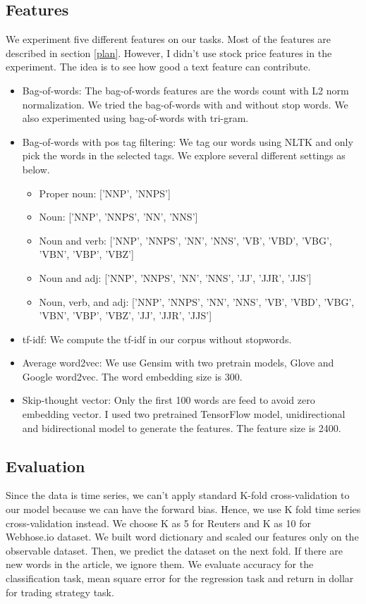 \documentclass[sigconf]{acmart}
\begin{document}
\subsection{Features}
We experiment five different features on our tasks. Most of the features are described in section \ref{plan}. However, I didn't use stock price features in the experiment.
The idea is to see how good a text feature can contribute.
\begin{itemize}
	\item Bag-of-words: The bag-of-words features are the words count with L2 norm normalization. We tried the bag-of-words with and without stop words. We also experimented using bag-of-words with tri-gram.
	\item Bag-of-words with pos tag filtering: We tag our words using NLTK \cite{nltk} and only pick the words in the selected tags. We explore several different settings as below.
		\begin{itemize}
			\item Proper noun: ['NNP', 'NNPS']
			\item Noun: ['NNP', 'NNPS', 'NN', 'NNS']
			\item Noun and verb: ['NNP', 'NNPS', 'NN', 'NNS', 'VB', 'VBD', 'VBG', 'VBN', 'VBP', 'VBZ']
			\item Noun and adj: ['NNP', 'NNPS', 'NN', 'NNS', 'JJ', 'JJR', 'JJS']
			\item Noun, verb, and adj: ['NNP', 'NNPS', 'NN', 'NNS', 'VB', 'VBD', 'VBG', 'VBN', 'VBP', 'VBZ', 'JJ', 'JJR', 'JJS']
		\end{itemize}
	\item tf-idf: We compute the tf-idf in our corpus without stopwords.
	\item Average word2vec: We use Gensim \cite{gensim} with two pretrain models, Glove\cite{glove} and Google word2vec\cite{word2vec1, word2vec2}. The word embedding size is 300.
	\item Skip-thought vector\cite{skip}: Only the first 100 words are feed to avoid zero embedding vector. I used two pretrained TensorFlow\cite{tf} model, unidirectional and bidirectional model\cite{skip} to generate the features.
	The feature size is 2400.
\end{itemize} 

\subsection{Evaluation}
Since the data is time series, we can't apply standard K-fold cross-validation to our model because we can have the forward bias. Hence, we use K fold time series cross-validation instead. We choose K as 5 for Reuters and K as 10 for
Webhose.io dataset. We built word dictionary and scaled our features only on the observable dataset. Then, we predict the dataset on the next fold. If there are new words in the article, we ignore them.
We evaluate accuracy for the classification task, mean square error for the regression task and return in dollar for trading strategy task.
\end{document}
